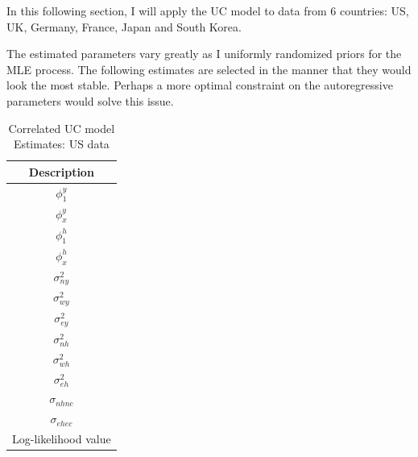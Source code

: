 \documentclass[fleqn]{article}
\begin{document}
\begin{outline}[enumerate]
In this following section, I will apply the UC model to data from 6 countries: US, UK, Germany, France, Japan and South Korea.

The estimated parameters vary greatly as I uniformly randomized priors for the MLE process. The following estimates are selected in the manner that they would look the most stable. Perhaps a more optimal constraint on the autoregressive parameters would solve this issue.

\pagebreak


\begin{table}
	\begin{center}
	\caption{Correlated UC model Estimates: US data}
	\begin{tabular}{c}
		\toprule
		Description\\
		\midrule
		$\phi^y_{1}$ \\
		$\phi^y_{x}$ \\		
		$\phi^h_{1}$ \\
		$\phi^h_{x}$ \\
		$\sigma^2_{ny}$\\
		$\sigma^2_{wy}$\\
		$\sigma^2_{ey}$\\
		$\sigma^2_{nh}$\\
		$\sigma^2_{wh}$\\
		$\sigma^2_{eh}$\\
		$\sigma_{nhnc}$\\
		$\sigma_{ehec}$\\
		Log-likelihood value\\
		\bottomrule
	\end{tabular}%
	\end{center}
\end{table}


\end{outline}
\end{document}
